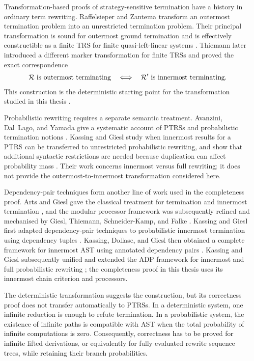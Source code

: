 Transformation-based proofs of strategy-sensitive termination have a history in
ordinary term rewriting.  Raffelsieper and Zantema transform an outermost
termination problem into an unrestricted termination problem.  Their principal
transformation is sound for outermost ground termination and is effectively
constructible as a finite TRS for finite quasi-left-linear systems
\cite{raffelsieper_zantema_2009}.  Thiemann later introduced a different marker
transformation for finite TRSs and proved the exact correspondence
\[
  \mathcal{R} \text{ is outermost terminating}
  \quad\Longleftrightarrow\quad
  \mathcal{R}' \text{ is innermost terminating}.
\]
This construction is the deterministic starting point for the transformation
studied in this thesis \cite{thiemann_2009_outermost}.

Probabilistic rewriting requires a separate semantic treatment.  Avanzini,
Dal~Lago, and Yamada give a systematic account of PTRSs and probabilistic
termination notions \cite{avanzini_dallago_yamada_2020}.  Kassing and Giesl
study when innermost results for a PTRS can be transferred to unrestricted
probabilistic rewriting, and show that additional syntactic restrictions are
needed because duplication can affect probability mass
\cite{kassing_giesl_2025}.  Their work concerns innermost versus full rewriting;
it does not provide the outermost-to-innermost transformation considered here.

Dependency-pair techniques form another line of work used in the completeness
proof.  Arts and Giesl gave the classical treatment for termination and
innermost termination \cite{arts_giesl_2000_dependency_pairs}, and the modular
processor framework was subsequently refined and mechanised by Giesl,
Thiemann, Schneider-Kamp, and Falke \cite{giesl2006mechanizing}.  Kassing and
Giesl first adapted dependency-pair techniques to probabilistic innermost
termination using dependency tuples
\cite{kassing_giesl_2023_probabilistic_dp}.  Kassing, Dollase, and Giesl then
obtained a complete framework for innermost AST using annotated dependency
pairs \cite{kassing_dollase_giesl_2024_complete_adp}.  Kassing and Giesl
subsequently unified and extended the ADP framework for innermost and full
probabilistic rewriting \cite{kassing_giesl_2026_adp}; the completeness proof
in this thesis uses its innermost chain criterion and processors.

The deterministic transformation suggests the construction, but its
correctness proof does not transfer automatically to PTRSs.  In a deterministic
system, one infinite reduction is enough to refute termination.  In a
probabilistic system, the existence of infinite paths is compatible with AST
when the total probability of infinite computations is zero.  Consequently,
correctness has to be proved for infinite lifted derivations, or equivalently
for fully evaluated rewrite sequence trees, while retaining their branch
probabilities.

